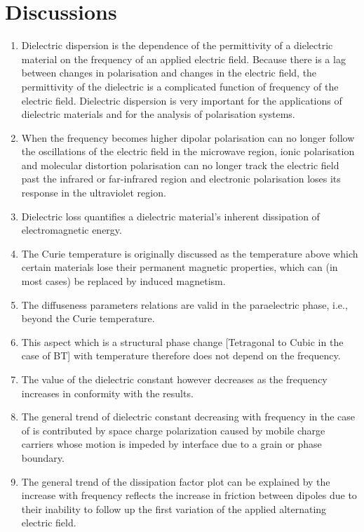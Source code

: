 \documentclass[%
 aip,
 amsmath,amssymb,
 reprint, floatfix%
]{revtex4-1}
\begin{document}
\section{Discussions}
\begin{enumerate}
    \item Dielectric dispersion is the dependence of the permittivity of a dielectric material on the frequency of an applied electric field. Because there is a lag between changes in polarisation and changes in the electric field, the permittivity of the dielectric is a complicated function of frequency of the electric field. Dielectric dispersion is very important for the applications of dielectric materials and for the analysis of polarisation systems.
    \item When the frequency becomes higher dipolar polarisation can no longer follow the oscillations of the electric field in the microwave region, ionic polarisation and molecular distortion polarisation can no longer track the electric field past the infrared or far-infrared region and electronic polarisation loses its response in the ultraviolet region.
    \item Dielectric loss quantifies a dielectric material's inherent dissipation of electromagnetic energy.
    \item The Curie temperature is originally discussed as the temperature above which certain materials lose their permanent magnetic properties, which can (in most cases) be replaced by induced magnetism.
    \item The diffuseness parameters relations are valid in the paraelectric phase, i.e., beyond the Curie temperature.
    \item This aspect which is a structural phase change [Tetragonal to Cubic in the case of BT] with temperature therefore does not depend on the frequency.
    \item The value of the dielectric constant however decreases as the frequency increases in conformity with the results.
    \item The general trend of dielectric constant decreasing with frequency in the case of  is contributed by space charge polarization caused by mobile charge carriers whose motion is impeded by interface due to a grain or phase boundary.
    \item The general trend of the dissipation factor plot can be explained by the increase with frequency reflects the increase in friction between dipoles due to their inability to follow up the first variation of the applied alternating electric field.
\end{enumerate}
\end{document}
